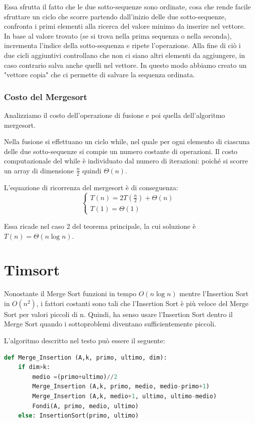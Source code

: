 Essa sfrutta il fatto che le due sotto-sequenze sono ordinate, cosa che rende facile sfruttare un ciclo che scorre partendo dall'inizio delle due sotto-sequenze, confronta i primi elementi alla ricerca del valore minimo da inserire nel vettore. In base al valore trovato (se si trova nella prima sequenza o nella seconda), incrementa l'indice della sotto-sequenza e ripete l'operazione. Alla fine di ciò i due cicli aggiuntivi controllano che non ci siano altri elementi da aggiungere, in caso contrario salva anche quelli nel vettore.
In questo modo abbiamo creato un "vettore copia" che ci permette di salvare la sequenza ordinata. 

\subsubsection{Costo del Mergesort}
Analizziamo il costo dell'operazione di fusione e poi quella dell'algoritmo mergesort. 

Nella fusione si effettuano un ciclo while, nel quale per ogni elemento di ciascuna delle due sotto-sequenze si compie un numero costante di operazioni. Il costo computazionale del while è individuato dal numero di iterazioni: poiché si scorre un array di dimensione $\frac{n}{2}$ quindi $\Theta(n)$.

L’equazione di ricorrenza del mergesort è di conseguenza: 
$$\begin{cases}
    T(n) = 2T(\frac{n}{2}) + \Theta(n)\\
    T(1) = \Theta(1)
\end{cases}$$

Essa ricade nel caso 2 del teorema principale, la cui soluzione è $T(n) = \Theta(n \log n)$.

\section*{Timsort}
Nonostante il Merge Sort funzioni in tempo $O(n \log n)$ mentre l'Insertion Sort in $O(n^2)$, i fattori costanti sono tali che l’Insertion Sort è più veloce del Merge Sort per valori piccoli di n. Quindi, ha senso usare l’Insertion Sort dentro il Merge Sort quando i sottoproblemi diventano sufficientemente piccoli.

L'algoritmo descritto nel testo può essere il seguente:
\begin{lstlisting}[language=Python]
def Merge_Insertion (A,k, primo, ultimo, dim):
    if dim>k:
        medio =(primo+ultimo)//2
        Merge_Insertion (A,k, primo, medio, medio-primo+1)
        Merge_Insertion (A,k, medio+1, ultimo, ultimo-medio)
        Fondi(A, primo, medio, ultimo)
    else: InsertionSort(primo, ultimo)
\end{lstlisting}

